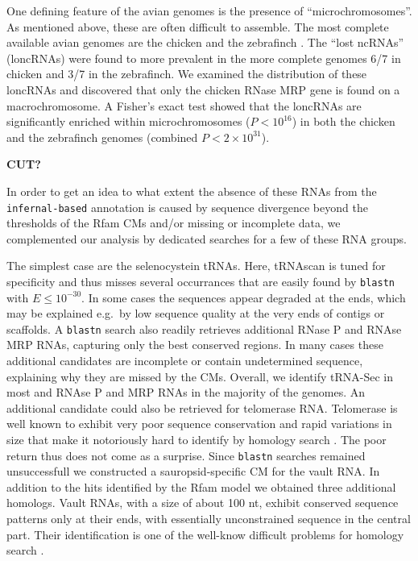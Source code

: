 \documentclass[10pt]{bmc_article}
\newenvironment{bmcformat}{\begin{raggedright}\baselineskip20pt\sloppy\setboolean{publ}{false}}{\end{raggedright}\baselineskip20pt\sloppy}
\begin{document}
\begin{bmcformat}
One defining feature of the avian genomes is the presence of
``microchromosomes''. As mentioned above, these are often difficult to
assemble. The most complete available avian genomes are the chicken
\cite{International_Chicken_Genome_Sequencing_Consortium:2004} and the
zebrafinch \cite{Warren:2010}. The ``lost ncRNAs'' (loncRNAs) were
found to more prevalent in the more complete genomes 6/7 in chicken
and 3/7 in the zebrafinch. We examined the distribution of these
loncRNAs and discovered that only the chicken RNase MRP gene is found
on a macrochromosome. A Fisher's exact test showed that the loncRNAs
are significantly enriched within microchromosomes ($P<10^{16}$) in
both the chicken and the zebrafinch genomes (combined $P<2\times
10^{31}$).


{\bf CUT?}

In order to get an idea to what extent the
absence of these RNAs from the \texttt{infernal-based} annotation is
caused by sequence divergence beyond the thresholds of the Rfam CMs
and/or missing or incomplete data, we complemented our analysis by
dedicated searches for a few of these RNA groups.

The simplest case are the selenocystein tRNAs. Here, tRNAscan is tuned
for specificity and thus misses several occurrances that are easily
found by \texttt{blastn} with $E\le 10^{-30}$. In some cases the
sequences appear degraded at the ends, which may be explained e.g.\ by
low sequence quality at the very ends of contigs or scaffolds. A
\texttt{blastn} search also readily retrieves additional RNase P and
RNAse MRP RNAs, capturing only the best conserved regions. In many
cases these additional candidates are incomplete or contain
undetermined sequence, explaining why they are missed by the
CMs. Overall, we identify tRNA-Sec in most and RNAse P and MRP RNAs in
the majority of the genomes. An additional candidate could also be
retrieved for telomerase RNA. Telomerase is well known to exhibit very
poor sequence conservation and rapid variations in size that make it
notoriously hard to identify by homology search \cite{Xie:08a}. The
poor return thus does not come as a surprise. Since \texttt{blastn}
searches remained unsuccessfull we constructed a sauropsid-specific CM
for the vault RNA. In addition to the hits identified by the Rfam
model we obtained three additional homologs. Vault RNAs, with a size
of about 100 nt, exhibit conserved sequence patterns only at their
ends, with essentially unconstrained sequence in the central
part. Their identification is one of the well-know difficult problems
for homology search \cite{Stadler:09b}.


\end{bmcformat}
\end{document}
